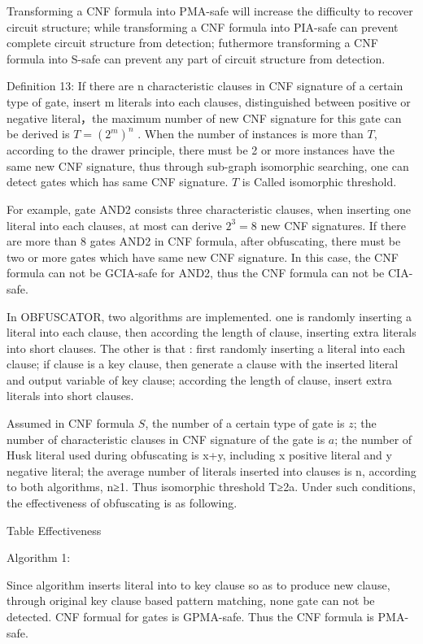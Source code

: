 \documentclass[runningheads,a4paper]{llncs}
\begin{document}
Transforming a CNF formula into PMA-safe will increase the difficulty to recover circuit structure; while transforming a CNF formula into PIA-safe can prevent complete circuit structure from detection; futhermore  transforming a CNF formula into S-safe can prevent any part of circuit structure from detection.

\noindent \newline Definition 13: If there are n characteristic clauses in CNF signature of a certain type of gate, insert m literals into each clauses, 
distinguished between positive or negative literal，the maximum number of new CNF signature for this gate can be derived is $T=(2^m)^n$ .
When the number of instances is more than $T$, according to the drawer principle, 
there must be 2 or more instances have the same new CNF signature, 
thus through sub-graph isomorphic searching, one can detect gates which has same CNF signature.
$T$ is Called isomorphic threshold.

For example, gate AND2 consists three characteristic clauses, when inserting one literal into each clauses, at most can derive $2^3=8$ new CNF signatures.
If there are more than 8 gates AND2 in CNF formula, after obfuscating, there must be two or more gates which have same new CNF signature.
In this case, the CNF formula can not be GCIA-safe for AND2, thus the CNF formula can not be CIA-safe.

In OBFUSCATOR, two algorithms are implemented. one is randomly inserting a literal into each clause, then according the length of clause, inserting extra literals into short clauses.
The other is that : first randomly inserting a literal into each clause; if clause is a key clause, then generate a clause with the inserted literal and output variable of key clause;
according the length of clause, insert extra literals into short clauses.

Assumed in CNF formula $S$, the number of a certain type of gate is $z$;
the number of characteristic clauses in CNF signature of the gate is $a$; 
the number of Husk literal used during obfuscating is x+y, 
including x positive literal and y negative literal;
the average number of literals inserted into clauses is n, 
according to both algorithms, n≥1. Thus isomorphic threshold T≥2a.
Under such conditions, the effectiveness of obfuscating is as following. 

Table Effectiveness

\noindent Algorithm 1:

Since algorithm inserts literal into to key clause so as to produce new clause, through original key clause based pattern matching, none gate can not be detected. CNF formual for gates is GPMA-safe. Thus the CNF formula is PMA-safe.
\end{document}
